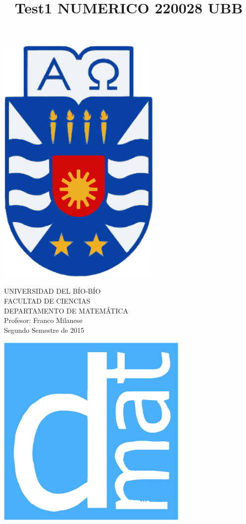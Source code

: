 \documentclass[11pt]{article}
\begin{document}
\title{Test1  NUMERICO 220028 UBB}

{\begin{minipage}{2cm}
\hspace*{1cm}\includegraphics[width=0.6\textwidth]{escubo-ubb.eps}
\end{minipage}
\begin{minipage}{12cm}
\small
{\bf \rm 
{
\begin{center}
{\footnotesize UNIVERSIDAD DEL B\'IO-B\'IO} \\
{\scriptsize FACULTAD DE CIENCIAS}  \\
{\scriptsize DEPARTAMENTO DE MATEM\'ATICA}  \\
{\scriptsize Profesor:  Franco Milanese}\\
{\scriptsize Segundo Semestre de 2015}
\end{center}
}}
\end{minipage}}
{\begin{minipage}{2cm}
\hspace*{-0.5cm}\vspace*{-0.05cm}\includegraphics[width=0.7\textwidth]{escudo-dmat.eps}
\end{minipage}}
\end{document}
